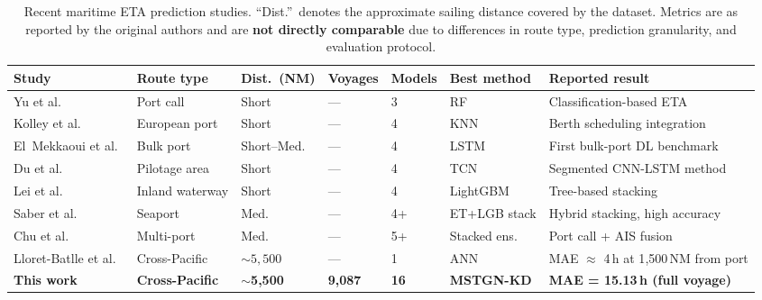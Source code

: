 \documentclass[sigconf,anonymous]{acmart}%
\begin{document}
\begin{table}[t]
    \centering
    \caption{Recent maritime ETA prediction studies. ``Dist.''~denotes the approximate sailing distance covered by the dataset. Metrics are as reported by the original authors and are \textbf{not directly comparable} due to differences in route type, prediction granularity, and evaluation protocol.}
    \label{tab:lit_comparison}
    \setlength{\tabcolsep}{3pt}
    \renewcommand{\arraystretch}{1.15}
    \begin{tabular}{P{2.5cm} P{1.5cm} P{1.7cm} P{1.5cm} P{1.2cm} P{2.0cm} P{3.8cm}}
        \toprule
        \textbf{Study} & \textbf{Route type} & \textbf{Dist.\ (NM)} & \textbf{Voyages} & \textbf{Models} & \textbf{Best method} & \textbf{Reported result} \\
        \midrule
        Yu et al.~\cite{yuShipArrivalPrediction2018} & Port call & Short & --- & 3 & RF & Classification-based ETA \\
        Kolley et al.~\cite{kolleyRobustBerthScheduling2022} & European port & Short & --- & 4 & KNN & Berth scheduling integration \\
        El~Mekkaoui et al.~\cite{elmekkaouiDeepLearningModels2022} & Bulk port & Short--Med. & --- & 4 & LSTM & First bulk-port DL benchmark \\
        Du et al.~\cite{duSegmentedETAPrediction2025} & Pilotage area & Short & --- & 4 & TCN & Segmented CNN-LSTM method \\
        Lei et al.~\cite{leiPredictingVesselArrival2024} & Inland waterway & Short & --- & 4 & LightGBM & Tree-based stacking \\
        Saber et al.~\cite{saberHighaccuracyPredictionVessels2025} & Seaport & Med. & --- & 4+ & ET+LGB stack & Hybrid stacking, high accuracy \\
        Chu et al.~\cite{chuVesselArrivalTime2025} & Multi-port & Med. & --- & 5+ & Stacked ens. & Port call + AIS fusion \\
        Lloret-Batlle et al.~\cite{lloretbatlle2025} & Cross-Pacific & ${\sim}5{,}500$ & --- & 1 & ANN & MAE $\approx$ 4\,h at 1{,}500\,NM from port \\
        \midrule
        \textbf{This work} & \textbf{Cross-Pacific} & $\boldsymbol{\sim}$\textbf{5,500} & \textbf{9,087} & \textbf{16} & \textbf{MSTGN-KD} & \textbf{MAE = 15.13\,h (full voyage)} \\
        \bottomrule
    \end{tabular}
\end{table}
\end{document}
